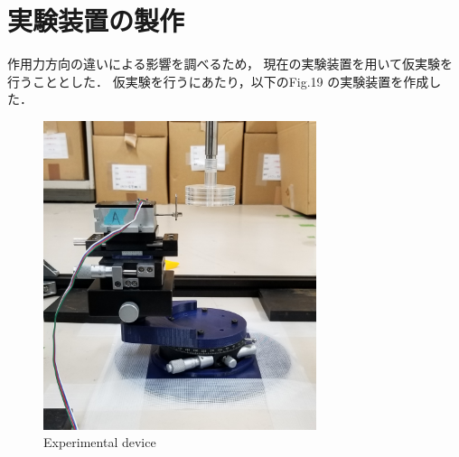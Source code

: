 \documentclass[twocolumn,a4j]{jsarticle}
\begin{document}

\newpage

\section{実験装置の製作}
作用力方向の違いによる影響を調べるため，
現在の実験装置を用いて仮実験を行うこととした．
仮実験を行うにあたり，以下のFig.19 の実験装置を作成した．
\begin{figure}[htbp]
    \footnotesize
    \begin{center}
        \includegraphics[width=80mm]{../images/device_1.jpg}
        \caption{Experimental device}
    \end{center}
\end{figure}
\end{document}
